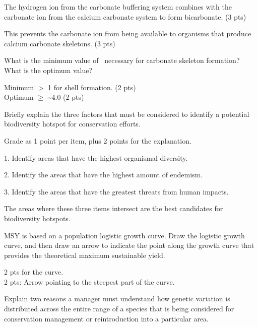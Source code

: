 \documentclass[11pt, addpoints]{exam}
\newcommand*\AnswerBox[2]{%
    \parbox[t][#1]{0.92\textwidth}{%
    \begin{solution}#2\end{solution}}
    \vspace*{\stretch{1}}
}
\newenvironment{AnswerPage}[1]
    {\begin{minipage}[t][#1]{0.92\textwidth}%
    \begin{solution}}
    {\end{solution}\end{minipage}
    \vspace*{\stretch{1}}}
\newlength{\basespace}
\begin{document}
\begin{questions}
\begin{AnswerPage}{6\basespace}
\vspace{\baselineskip}

The hydrogen ion from the carbonate buffering system combines with the carbonate ion from the calcium carbonate system to form bicarbonate. (3 pts) 

This prevents the carbonate ion from being available to organisms that produce calcium carbonate skeletons. (3 pts)

\end{AnswerPage}

\question[5]
What is the minimum value of \Omega\ necessary for carbonate skeleton
formation? What is the optimum value?

\AnswerBox{1\basespace}{%
Minimum $>$ 1 for shell formation. (2 pts)\\
Optimum $\ge$ \textasciitilde4.0 (2 pts)
}
\newpage

\question[10]
Briefly explain the three factors that must be considered to identify
a potential biodiversity hotspot for conservation efforts.

\begin{AnswerPage}{4\basespace}%

Grade as 1 point per item, plus 2 points for the explanation.\vspace{\baselineskip}

1. Identify areas that have the highest organismal diversity.

2. Identify the areas that have the highest amount of endemism.

3. Identify the areas that have the greatest threats from human impacts.

The areas where these three items intersect are the best candidates for biodiversity hotspots.
\end{AnswerPage}
 
\newpage

\question[5]
 MSY is based on a population logistic growth curve. Draw the logistic
growth curve, and then draw an arrow to indicate the point along the
growth curve that provides the theoretical maximum sustainable yield.

\AnswerBox{1\basespace}{%
2 pts for the curve. \\
2 pts: Arrow pointing to the steepest part of the curve.
}

\question[10]
Explain two reasons a manager must understand how genetic variation is
distributed across the entire range of a species that is being
considered for conservation management or reintroduction into a
particular area.


\end{questions}
\end{document}
